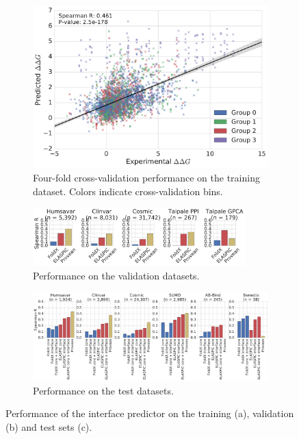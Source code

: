 \clearpage

\begin{figure}[tb]
	\centering
	\begin{subfigure}[b]{1.0\textwidth}
		\centering
		\includegraphics[width=0.6\linewidth]{static/elaspic_training_set/validation/crossvalidation_performance_interface.pdf}
		\caption{Four-fold cross-validation performance on the training dataset. Colors indicate cross-validation bins.}
		\vspace*{10mm}
	\end{subfigure}
	\begin{subfigure}[b]{1.0\textwidth}
		\centering
		\includegraphics[width=0.9\textwidth]{static/elaspic_training_set/validation/validation_performance_interface.pdf}
		\caption{Performance on the validation datasets.}
		\vspace*{10mm}
	\end{subfigure}
	\begin{subfigure}[b]{1.0\textwidth}
		\centering
		\includegraphics[width=1.0\textwidth]{static/elaspic_training_set/validation/test_performance_interface.pdf}
		\caption{Performance on the test datasets.}
	\end{subfigure}
	\caption[Interface predictor validation.]{Performance of the interface predictor on the training (a), validation (b) and test sets (c).}
\end{figure}
